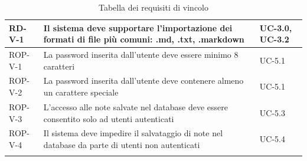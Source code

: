 \documentclass[11pt,a4paper]{article}
\begin{document}
\begin{longtable}{|p{}|>{\raggedright\arraybackslash}p{}|p{}|}
\hline
RD-V-1 & Il sistema deve supportare l'importazione dei formati di file più comuni: .md, .txt, .markdown & UC-3.0, UC-3.2 \\
\hline
ROP-V-1 & La password inserita dall'utente deve essere minimo 8 caratteri & UC-5.1 \\
\hline
ROP-V-2 & La password inserita dall'utente deve contenere almeno un carattere speciale & UC-5.1 \\
\hline
ROP-V-3 & L'accesso alle note salvate nel database deve essere consentito solo ad utenti autenticati & UC-5.3 \\
\hline
ROP-V-4 & Il sistema deve impedire il salvataggio di note nel database da parte di utenti non autenticati & UC-5.4 \\
\hline
\addlinespace[1em]
\caption{Tabella dei requisiti di vincolo}
\end{longtable}


\newpage
\end{document}
